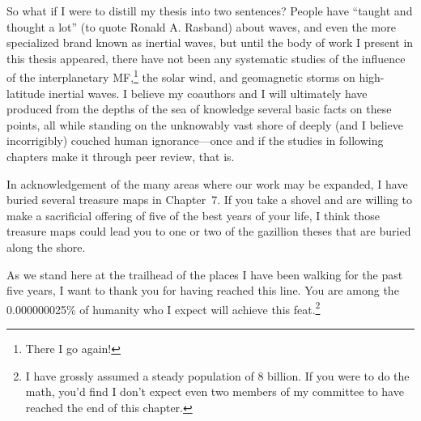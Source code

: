 So what if I were to distill my thesis into two sentences? People have ``taught
and thought a lot'' (to quote Ronald A. Rasband) about \Alf waves, and even the
more specialized brand known as inertial \Alf waves, but until the body of work
I present in this thesis appeared, there have not been any systematic studies of
the influence of the interplanetary MF,\footnote{There I go again!} the solar wind,
and geomagnetic storms on high-latitude inertial \Alf waves. I believe my
coauthors and I will ultimately have produced from the depths of the sea of
knowledge several basic facts on these points, all while standing on the
unknowably vast shore of deeply (and I believe incorrigibly) couched human
ignorance---once and if the studies in following chapters make it through peer
review, that is. 

In acknowledgement of the many areas where our work may be expanded, I have
buried several treasure maps in Chapter~7. If you take a shovel and are willing
to make a sacrificial offering of five of the best years of your life, I think
those treasure maps could lead you to one or two of the gazillion theses that
are buried along the shore.

As we stand here at the trailhead of the places I have been walking for the past
five years, I want to thank you for having reached this line. You are among the
0.000000025\% of humanity who I expect will achieve this feat.\footnote{I have
  grossly assumed a steady population of 8 billion. If you were to do the math,
  you'd find I don't expect even two members of my committee to have reached
  the end of this chapter.}



